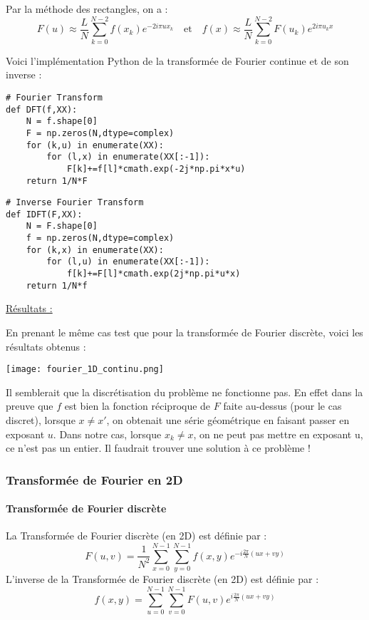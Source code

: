 Par la méthode des rectangles, on a :
$$F(u)\approx\frac{L}{N}\sum_{k=0}^{N-2}f(x_k)e^{-2i\pi ux_k} \quad \text{et} \quad f(x)\approx\frac{L}{N}\sum_{k=0}^{N-2}F(u_k)e^{2i\pi u_kx}$$

Voici l'implémentation Python de la transformée de Fourier continue et de son inverse :

\begin{lstlisting}
# Fourier Transform
def DFT(f,XX):
	N = f.shape[0]
	F = np.zeros(N,dtype=complex)
	for (k,u) in enumerate(XX):
		for (l,x) in enumerate(XX[:-1]):
			F[k]+=f[l]*cmath.exp(-2j*np.pi*x*u)
	return 1/N*F
\end{lstlisting}
\begin{lstlisting}
# Inverse Fourier Transform
def IDFT(F,XX):
	N = F.shape[0]
	f = np.zeros(N,dtype=complex)
	for (k,x) in enumerate(XX):
		for (l,u) in enumerate(XX[:-1]):
			f[k]+=F[l]*cmath.exp(2j*np.pi*u*x)
	return 1/N*f
\end{lstlisting}

\underline{Résultats :}

En prenant le même cas test que pour la transformée de Fourier discrète, voici les résultats obtenus :

\begin{minipage}{\linewidth}
	\centering
	\texttt{[image: fourier\_1D\_continu.png]}
\end{minipage}

\begin{Rem}
	Il semblerait que la discrétisation du problème ne fonctionne pas. En effet dans la preuve que $f$ est bien la fonction réciproque de $F$ faite au-dessus (pour le cas discret), lorsque $x\ne x'$, on obtenait une série géométrique en faisant passer en exposant $u$. Dans notre cas, lorsque $x_k\ne x$, on ne peut pas mettre en exposant u, ce n'est pas un entier. Il faudrait trouver une solution à ce problème !
\end{Rem}

\subsubsection{Transformée de Fourier en 2D}

\paragraph{Transformée de Fourier discrète \\}

\noindent La Transformée de Fourier discrète (en 2D) est définie par :
$$F(u,v)=\frac{1}{N^2}\sum_{x=0}^{N-1}\sum_{y=0}^{N-1}f(x,y)e^{-i\frac{2\pi}{N}(ux+vy)}$$
L'inverse de la Transformée de Fourier discrète (en 2D) est définie par :
$$f(x,y)=\sum_{u=0}^{N-1}\sum_{v=0}^{N-1}F(u,v)e^{i\frac{2\pi}{N}(ux+vy)}$$

